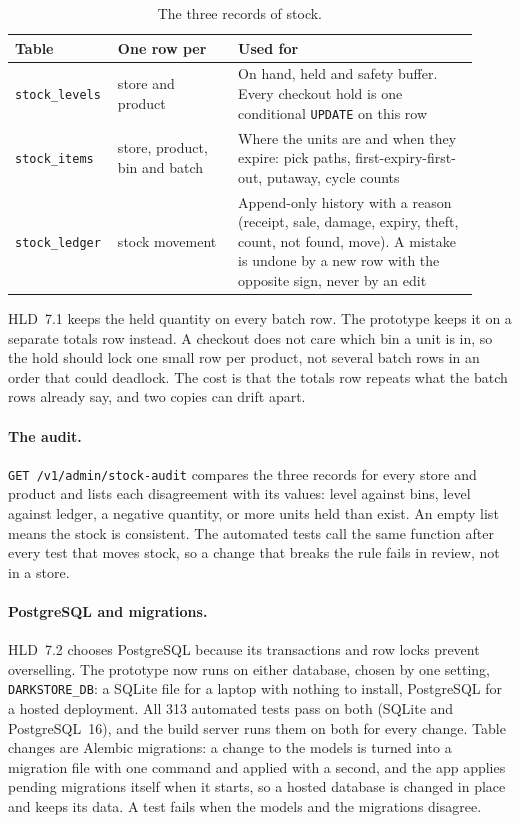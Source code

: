 \begin{table}[ht]
  \centering
  \footnotesize
  \begin{tabular}{@{}>{\raggedright\arraybackslash}p{0.17\linewidth}>{\raggedright\arraybackslash}p{0.25\linewidth}
                  >{\raggedright\arraybackslash}p{0.5\linewidth}@{}}
    \toprule
    Table & One row per & Used for \\
    \midrule
    \texttt{stock\_levels} & store and product & On hand, held and safety buffer. Every checkout hold is one
      conditional \texttt{UPDATE} on this row \\
    \addlinespace[3pt]
    \texttt{stock\_items} & store, product, bin and batch & Where the units are and when they expire: pick paths,
      first-expiry-first-out, putaway, cycle counts \\
    \addlinespace[3pt]
    \texttt{stock\_ledger} & stock movement & Append-only history with a reason (receipt, sale, damage, expiry,
      theft, count, not found, move). A mistake is undone by a new row with the opposite sign, never by an edit \\
    \bottomrule
  \end{tabular}
  \caption{The three records of stock.}
  \label{tab:m1-stock-records}
\end{table}

HLD~7.1 keeps the held quantity on every batch row. The prototype keeps it on a separate totals row instead. A
checkout does not care which bin a unit is in, so the hold should lock one small row per product, not several batch
rows in an order that could deadlock. The cost is that the totals row repeats what the batch rows already say, and
two copies can drift apart.

\paragraph{The audit.} \texttt{GET /v1/admin/stock-audit} compares the three records for every store and product
and lists each disagreement with its values: level against bins, level against ledger, a negative quantity, or
more units held than exist. An empty list means the stock is consistent. The automated tests call the same function
after every test that moves stock, so a change that breaks the rule fails in review, not in a store.

\paragraph{PostgreSQL and migrations.} HLD~7.2 chooses PostgreSQL because its transactions and row locks prevent
overselling. The prototype now runs on either database, chosen by one setting, \texttt{DARKSTORE\_DB}: a SQLite file
for a laptop with nothing to install, PostgreSQL for a hosted deployment. All 313 automated tests pass on both
(SQLite and PostgreSQL~16), and the build server runs them on both for every change. Table changes are Alembic
migrations: a change to the models is turned into a migration file with one command and applied with a second, and
the app applies pending migrations itself when it starts, so a hosted database is changed in place and keeps its
data. A test fails when the models and the migrations disagree.

